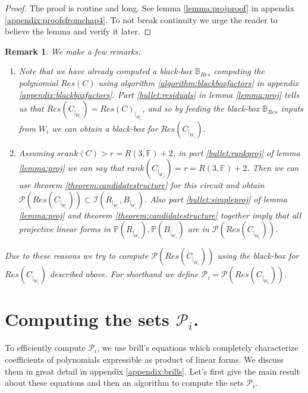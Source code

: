 \documentclass[12pt]{caltech_thesis}
\theoremstyle{plain}
\newtheorem{remark}{Remark}
\theoremstyle{definition}
\newcommand{\F}{\mathbb{F}}
\newcommand{\MP}{\mathcal{P}}
\newcommand{\MI}{\mathcal{I}}
\newcommand{\CB}{\mathbb{B}}
\newcommand{\PP}{\mathbb{P}}
\begin{document}
\begin{proof}
The proof is routine and long. See lemma \ref{lemma:projproof} in appendix \ref{appendix:proofsfromchap4}. To not break
continuity we urge the reader to believe the lemma and verify it later.
\end{proof}

\begin{remark}\label{remark:reason}
We make a few remarks:
 \begin{enumerate}
  \item \label{bullet:residualblackbox} Note that we have already computed a black-box $\CB_{Res}$ computing the polynomial $Res(C)$ using 
  algorithm \ref{algorithm:blackboxfactors}
  in appendix \ref{appendix:blackboxfactors}. Part \ref{bullet:residuals} in lemma \ref{lemma:proj} tells us that 
  $Res(C_{|_{W_i}}) = Res(C)_{|_{W_i}}$, and so
  by feeding the black-box $\CB_{Res}$ inputs from $W_i$ we can obtain a black-box for $Res(C_{|_{W_i}})$.
 
 \item Assuming $srank(C)> r = R(3,\F)+2$, in part \ref{bullet:rankproj} of lemma \ref{lemma:proj} we can say that
 $rank(C_{|_{W_j}})=r = R(3,\F)+2$. Then we can use theorem \ref{theorem:candidatestructure} for this circuit and
 obtain $\MP(Res(C_{|_{W_i}}))\subset \MI(R_{|_{W_i}}, B_{|_{W_i}})$. Also part \ref{bullet:simpleproj} of lemma \ref{lemma:proj}
  and theorem \ref{theorem:candidatestructure} together imply that all   projective linear forms in 
  $\PP(R_{|_{W_i}}), \PP(B_{|_{W_i}})$ are in $\MP(Res(C_{|_{W_i}}))$.
\end{enumerate}
Due to these reasons we try to compute $\MP(Res(C_{|_{W_i}}))$ using the black-box for $Res(C_{|_{W_i}})$ described above.
For shorthand we define $\MP_i = \MP(Res(C_{|_{W_i}}))$.

\end{remark}




\section{Computing the sets $\MP_i$. }

To efficiently compute $\MP_i$, we use brill's equations which
completely characterize coefficients of polynomials expressible as product of linear forms. We discuss them in great detail in 
appendix \ref{appendix:brills}.
Let's first give the main result about these equations and then an algorithm to compute the sets $\MP_i$.
\end{document}
